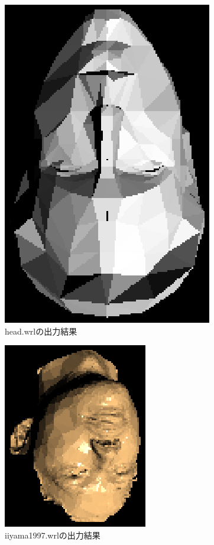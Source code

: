\documentclass[a4j,dvipdfmx]{jsarticle}
\begin{document}
\begin{figure}[hp]
  \begin{center}
    \includegraphics[clip,scale=0.5]{images/Kadai03ForHead.eps}
    \caption{head.wrlの出力結果}
    \label{fig:head}
  \end{center}
\end{figure}

\begin{figure}[hp]
  \begin{center}
    \includegraphics[clip,scale=0.5]{images/Kadai03ForIiyama1997.eps}
    \caption{iiyama1997.wrlの出力結果}
    \label{fig:1997}
  \end{center}
\end{figure}
\end{document}
